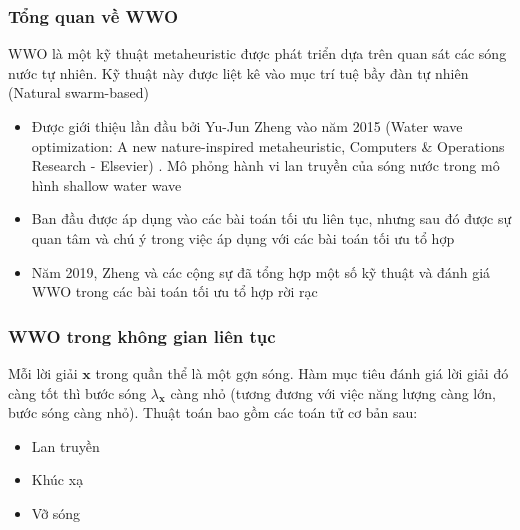 \begin{frame}
    \frametitle{Tổng quan về WWO}
    WWO là một kỹ thuật metaheuristic được phát triển dựa trên quan sát các sóng nước tự nhiên. Kỹ thuật này được liệt kê vào mục trí tuệ bầy đàn tự nhiên (Natural swarm-based) \cite{hussain2019metaheuristic}
    
    \begin{itemize}
        \item Được giới thiệu lần đầu bởi Yu-Jun Zheng vào năm 2015 (Water wave optimization: A new nature-inspired metaheuristic, Computers \& Operations Research - Elsevier) \cite{zheng2015water}. Mô phỏng hành vi lan truyền của sóng nước trong mô hình shallow water wave
        \item Ban đầu được áp dụng vào các bài toán tối ưu liên tục, nhưng sau đó được sự quan tâm và chú ý trong việc áp dụng với các bài toán tối ưu tổ hợp
        \item Năm 2019, Zheng và các cộng sự đã tổng hợp một số kỹ thuật và đánh giá WWO trong các bài toán tối ưu tổ hợp rời rạc \cite{zheng2019water}
    \end{itemize}
\end{frame}

\begin{frame}
    \frametitle{WWO trong không gian liên tục}
    Mỗi lời giải $\mathbf{x}$ trong quần thể là một gợn sóng. Hàm mục tiêu đánh giá lời giải đó càng tốt thì bước sóng $\lambda_{\mathbf{x}}$ càng nhỏ (tương đương với việc năng lượng càng lớn, bước sóng càng nhỏ).
    Thuật toán bao gồm các toán tử cơ bản sau:
    \begin{itemize}
        \item Lan truyền
        \item Khúc xạ
        \item Vỡ sóng
    \end{itemize}
\end{frame}

